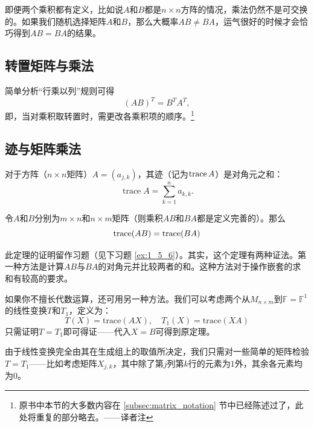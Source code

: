 即便两个乘积都有定义，比如说$A$和$B$都是$n\times n$方阵的情况，乘法仍然不是可交换的。如果我们随机选择矩阵$A$和$B$，那么大概率$AB\ne BA$，运气很好的时候才会恰巧得到$AB=BA$的结果。

\subsection{转置矩阵与乘法}

简单分析“行乘以列”规则可得\[(AB)^{T}=B^{T}A^{T},\]
即，当对乘积取转置时，需更改各乘积项的顺序。\footnote{原书中本节的大多数内容在 \ref{subsec:matrix_notation} 节中已经陈述过了，此处将重复的部分略去。——译者注}

\subsection{迹与矩阵乘法}

对于方阵（$n\times n$矩阵）$A=(a_{j,k})$，其迹（记为$\operatorname{trace} A$）是对角元之和：
\[\operatorname{trace}A=\sum_{k=1}^{n}a_{k,k}.\]
\begin{theorem}\label{thm:trace_commute}
    令$A$和$B$分别为$m\times n$和$n\times m$矩阵（则乘积$AB$和$BA$都是定义完善的）。那么\[\operatorname{trace} (AB)=\operatorname{trace}(BA)\]
\end{theorem}
此定理的证明留作习题（见下习题 \ref{ex:1_5_6}）。其实，这个定理有两种证法。第一种方法是计算$AB$与$BA$的对角元并比较两者的和。这种方法对于操作嵌套的求和有较高的要求。

如果你不擅长代数运算，还可用另一种方法。我们可以考虑两个从$M_{n\times m}$到$\mathbb{F}=\mathbb{F}^1$的线性变换$T$和$T_1$，定义为：\[T(X)=\mathrm{trace}(AX),\quad T_{1}(X)=\mathrm{trace}(XA)\]
只需证明$T=T_1$即可得证——代入$X=B$可得到原定理。

由于线性变换完全由其在生成组上的取值所决定，我们只需对一些简单的矩阵检验$T=T_1$——比如考虑矩阵$X_{j,k}$，其中除了第$j$列第$k$行的元素为$1$外，其余各元素均为$0$。

